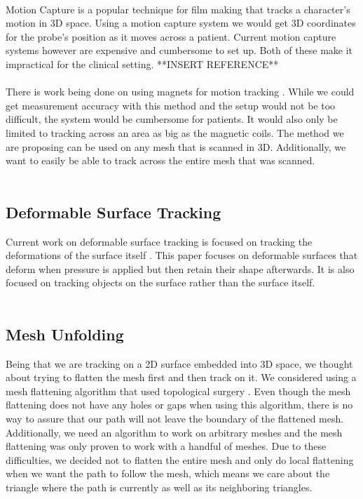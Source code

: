 \documentclass[conference]{acmsiggraph}
\begin{document}
\\
Motion Capture is a popular technique for film making that tracks a character's motion in 3D space. Using a motion capture system we would get 3D coordinates for the probe's position as it moves across a patient. Current motion capture systems however are expensive and cumbersome to set up. Both of these make it impractical for the clinical setting. **INSERT REFERENCE**\\
\\
There is work being done on using magnets for motion tracking \cite{magnetictracking}. While we could get measurement accuracy with this method and the setup would not be too difficult, the system would be cumbersome for patients. It would also only be limited to tracking across an area as big as the magnetic coils. The method we are proposing can be used on any mesh that is scanned in 3D. Additionally, we want to easily be able to track across the entire mesh that was scanned.\\
\\

\subsection{Deformable Surface Tracking}

Current work on deformable surface tracking is focused on tracking the deformations of the surface itself \cite{deformableobjecttracking,convexopt}. This paper focuses on deformable surfaces that deform when pressure is applied but then retain their shape afterwards. It is also focused on tracking objects on the surface rather than the surface itself.\\
\\

\subsection{Mesh Unfolding}

Being that we are tracking on a 2D surface embedded into 3D space, we thought about trying to flatten the mesh first and then track on it. We considered using a mesh flattening algorithm that used topological surgery \cite{meshunfolding}. Even though the mesh flattening does not have any holes or gaps when using this algorithm, there is no way to assure that our path will not leave the boundary of the flattened mesh. Additionally, we need an algorithm to work on arbitrary meshes and the mesh flattening was only proven to work with a handful of meshes. Due to these difficulties, we decided not to flatten the entire mesh and only do local flattening when we want the path to follow the mesh, which means we care about the triangle where the path is currently as well as its neighboring triangles. 
\end{document}
